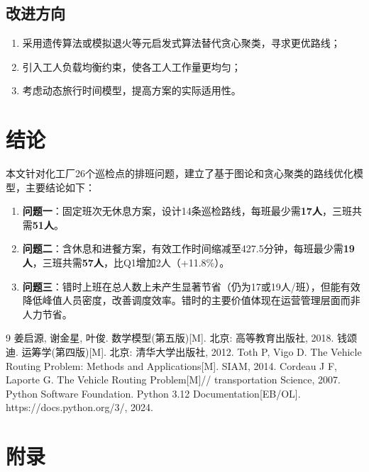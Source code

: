 \documentclass[12pt,a4paper]{article}
\begin{document}
\subsection{改进方向}
\begin{enumerate}
    \item 采用遗传算法或模拟退火等元启发式算法替代贪心聚类，寻求更优路线；
    \item 引入工人负载均衡约束，使各工人工作量更均匀；
    \item 考虑动态旅行时间模型，提高方案的实际适用性。
\end{enumerate}

\section{结论}

本文针对化工厂26个巡检点的排班问题，建立了基于图论和贪心聚类的路线优化模型，主要结论如下：

\begin{enumerate}
    \item \textbf{问题一}：固定班次无休息方案，设计14条巡检路线，每班最少需\textbf{17人}，三班共需\textbf{51人}。
    \item \textbf{问题二}：含休息和进餐方案，有效工作时间缩减至427.5分钟，每班最少需\textbf{19人}，三班共需\textbf{57人}，比Q1增加2人（+11.8\%）。
    \item \textbf{问题三}：错时上班在总人数上未产生显著节省（仍为17或19人/班），但能有效降低峰值人员密度，改善调度效率。错时的主要价值体现在运营管理层面而非人力节省。
\end{enumerate}

\begin{thebibliography}{9}
 姜启源, 谢金星, 叶俊. 数学模型(第五版)[M]. 北京: 高等教育出版社, 2018.
 钱颂迪. 运筹学(第四版)[M]. 北京: 清华大学出版社, 2012.
 Toth P, Vigo D. The Vehicle Routing Problem: Methods and Applications[M]. SIAM, 2014.
 Cordeau J F, Laporte G. The Vehicle Routing Problem[M]// transportation Science, 2007.
 Python Software Foundation. Python 3.12 Documentation[EB/OL]. https://docs.python.org/3/, 2024.
\end{thebibliography}

\newpage
\section*{附录}
\end{document}
